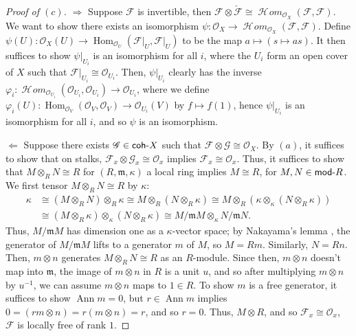 \documentclass[12pt,letterpaper]{article}
\theoremstyle{definition}
\theoremstyle{remark}
\numberwithin{equation}{section}
\numberwithin{figure}{problem}
\DeclareMathOperator{\Ann}{Ann}
\DeclareMathOperator{\Hom}{Hom}
\newcommand{\FF}{\mathscr{F}}
\newcommand{\GG}{\mathscr{G}}
\newcommand{\OO}{\mathcal{O}}
\DeclareMathOperator{\HHom}{\mathscr{H}\!\mathit{om}}
\newcommand{\Mod}{\mathsf{mod}\mathchar`-}
\newcommand{\coh}{\mathsf{coh}\mathchar`-}
\begin{document}
\begin{proof}[Proof of $(c)$]
  $\Rightarrow$ Suppose $\FF$ is invertible, then $\FF \otimes \check{\FF} \cong \HHom_{\OO_X}(\FF,\FF)$. We want to show there exists an isomorphism $\psi\colon\OO_X\to\HHom_{\OO_X}(\FF,\FF)$. Define $\psi(U) \colon \OO_X(U) \to \Hom_{\OO_U}(\FF\vert_U,\FF\vert_U)$ to be the map $a \mapsto (s \mapsto as)$. It then suffices to show $\psi\vert_{U_i}$ is an isomorphism for all $i$, where the $U_i$ form an open cover of $X$ such that $\FF\vert_{U_i} \cong \OO_{U_i}$. Then, $\psi\vert_{U_i}$ clearly has the inverse $\varphi_i\colon \HHom_{\OO_{U_i}}(\OO_{U_i},\OO_{U_i}) \to \OO_{U_i}$, where we define $\varphi_i(U) \colon \Hom_{\OO_{V}}(\OO_{V},\OO_{V}) \to \OO_{U_i}(V)$ by $f \mapsto f(1)$, hence $\psi\vert_{U_i}$ is an isomorphism for all $i$, and so $\psi$ is an isomorphism.
  \par $\Leftarrow$ Suppose there exists $\GG \in \coh X$ such that $\FF \otimes \GG \cong \OO_X$. By $(a)$, it suffices to show that on stalks, $\FF_x \otimes \GG_x \cong \OO_x$ implies $\FF_x \cong \OO_x$. Thus, it suffices to show that $M \otimes_R N \cong R$ for $(R,\mathfrak{m},\kappa)$ a local ring implies $M \cong R$, for $M,N \in \Mod R$. We first tensor $M \otimes_R N \cong R$ by $\kappa$:
  \begin{align*}
    \kappa &\cong (M \otimes_R N) \otimes_R \kappa \cong M \otimes_R (N \otimes_R \kappa) \cong M \otimes_R (\kappa \otimes_\kappa (N \otimes_R \kappa))\\
    &\cong (M\otimes_R\kappa) \otimes_\kappa (N\otimes_R\kappa) \cong M/\mathfrak{m}M \otimes_\kappa N/\mathfrak{m}N.
  \end{align*}
  Thus, $M/\mathfrak{m}M$ has dimension one as a $\kappa$-vector space; by Nakayama's lemma \cite[Prop.~2.8]{AM69}, the generator of $M/\mathfrak{m}M$ lifts to a generator $m$ of $M$, so $M = Rm$. Similarly, $N = Rn$. Then, $m \otimes n$ generates $M \otimes_R N \cong R$ as an $R$-module. Since then, $m \otimes n$ doesn't map into $\mathfrak{m}$, the image of $m \otimes n$ in $R$ is a unit $u$, and so after multiplying $m \otimes n$ by $u^{-1}$, we can assume $m\otimes n$ maps to $1 \in R$. To show $m$ is a free generator, it suffices to show $\Ann m = 0$, but $r \in \Ann m$ implies $0 = (rm \otimes n) = r(m \otimes n) = r$, and so $r = 0$. Thus, $M \otimes R$, and so $\FF_x \cong \OO_x$, $\FF$ is locally free of rank $1$.
\end{proof}
\end{document}
